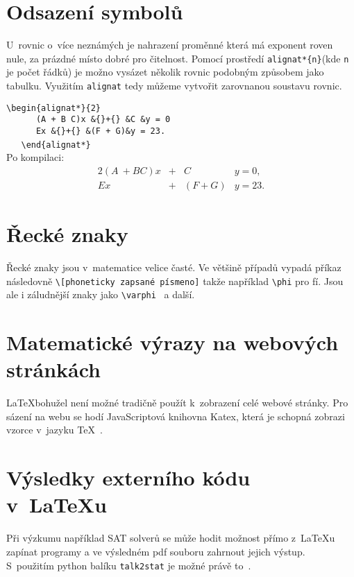 \documentclass[11pt, a4paper, hyphens]{article}
\begin{document}
\section{Odsazení symbolů}
U~rovnic o~více neznámých je nahrazení proměnné která má exponent roven nule, za prázdné místo dobré pro čitelnost.
Pomocí prostředí \verb|alignat*{n}|(kde \verb|n| je počet řádků) je možno vysázet několik rovnic podobným způsobem
jako tabulku.
Využitím \verb|alignat| tedy můžeme vytvořit zarovnanou soustavu rovnic.

\verb|\begin{alignat*}{2}| \\
\verb|      (A + B C)x &{}+{} &C &y = 0| \\
\verb|      Ex &{}+{} &(F + G)&y = 23.| \\
\verb|   \end{alignat*}|~\cite{GratzerGeorgeA.2007MmiL} \\
\quad Po kompilaci:
\begin{alignat*}{2}
    (A~+ B C)x & + & C       & y = 0,  \\
    Ex         & + & (F + G) & y = 23.
\end{alignat*}

\section{Řecké znaky}
Řecké znaky jsou v~matematice velice časté. Ve většině případů vypadá příkaz následovně \verb|\[phoneticky zapsané písmeno]| takže
například \verb|\phi| pro fí. Jsou ale i záludnější znaky jako \verb|\varphi|~\cite{SebekMichal2007Idsp} a další.

\section{Matematické výrazy na webových stránkách}
\LaTeX bohužel není možné tradičně použít k~zobrazení celé webové stránky. Pro sázení na webu se hodí JavaScriptová knihovna Katex, která je schopná
zobrazi vzorce v~jazyku \TeX~\cite{SimovaHana2018Zmvd}.

\section{Výsledky externího kódu v~\LaTeX u}
Při výzkumu například SAT solverů se může hodit možnost přímo z~\LaTeX u zapínat programy a ve výsledném pdf souboru zahrnout jejich výstup.
S~použitím python balíku \texttt{talk2stat} je možné právě to~\cite{BarHaim2021RSwL}.
\end{document}
